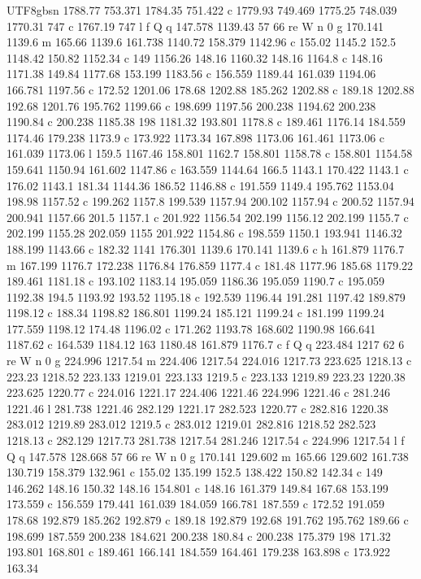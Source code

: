 \documentclass[11pt,a4paper,oneside]{report}
\begin{document}
\begin{CJK*}{UTF8}{gbsn}
{1788.77 753.371 1784.35 751.422 c 1779.93 749.469 1775.25 748.039 1770.31 747 c 1767.19 747 l f Q q
147.578 1139.43 57 66 re W n 0 g 170.141 1139.6 m 165.66 1139.6 161.738 1140.72 158.379 1142.96 c 155.02
1145.2 152.5 1148.42 150.82 1152.34 c 149 1156.26 148.16 1160.32 148.16 1164.8 c 148.16 1171.38 149.84
1177.68 153.199 1183.56 c 156.559 1189.44 161.039 1194.06 166.781 1197.56 c 172.52 1201.06 178.68 1202.88
185.262 1202.88 c 189.18 1202.88 192.68 1201.76 195.762 1199.66 c 198.699 1197.56 200.238 1194.62 200.238
1190.84 c 200.238 1185.38 198 1181.32 193.801 1178.8 c 189.461 1176.14 184.559 1174.46 179.238 1173.9 c
173.922 1173.34 167.898 1173.06 161.461 1173.06 c 161.039 1173.06 l 159.5 1167.46 158.801 1162.7 158.801
1158.78 c 158.801 1154.58 159.641 1150.94 161.602 1147.86 c 163.559 1144.64 166.5 1143.1 170.422 1143.1 c
176.02 1143.1 181.34 1144.36 186.52 1146.88 c 191.559 1149.4 195.762 1153.04 198.98 1157.52 c 199.262
1157.8 199.539 1157.94 200.102 1157.94 c 200.52 1157.94 200.941 1157.66 201.5 1157.1 c 201.922 1156.54
202.199 1156.12 202.199 1155.7 c 202.199 1155.28 202.059 1155 201.922 1154.86 c 198.559 1150.1 193.941
1146.32 188.199 1143.66 c 182.32 1141 176.301 1139.6 170.141 1139.6 c h 161.879 1176.7 m 167.199 1176.7
172.238 1176.84 176.859 1177.4 c 181.48 1177.96 185.68 1179.22 189.461 1181.18 c 193.102 1183.14 195.059
1186.36 195.059 1190.7 c 195.059 1192.38 194.5 1193.92 193.52 1195.18 c 192.539 1196.44 191.281 1197.42
189.879 1198.12 c 188.34 1198.82 186.801 1199.24 185.121 1199.24 c 181.199 1199.24 177.559 1198.12 174.48
1196.02 c 171.262 1193.78 168.602 1190.98 166.641 1187.62 c 164.539 1184.12 163 1180.48 161.879 1176.7 c
f Q q 223.484 1217 62 6 re W n 0 g 224.996 1217.54 m 224.406 1217.54 224.016 1217.73 223.625 1218.13 c
223.23 1218.52 223.133 1219.01 223.133 1219.5 c 223.133 1219.89 223.23 1220.38 223.625 1220.77 c 224.016
1221.17 224.406 1221.46 224.996 1221.46 c 281.246 1221.46 l 281.738 1221.46 282.129 1221.17 282.523
1220.77 c 282.816 1220.38 283.012 1219.89 283.012 1219.5 c 283.012 1219.01 282.816 1218.52 282.523
1218.13 c 282.129 1217.73 281.738 1217.54 281.246 1217.54 c 224.996 1217.54 l f Q q 147.578 128.668 57 66
re W n 0 g 170.141 129.602 m 165.66 129.602 161.738 130.719 158.379 132.961 c 155.02 135.199 152.5
138.422 150.82 142.34 c 149 146.262 148.16 150.32 148.16 154.801 c 148.16 161.379 149.84 167.68 153.199
173.559 c 156.559 179.441 161.039 184.059 166.781 187.559 c 172.52 191.059 178.68 192.879 185.262 192.879
c 189.18 192.879 192.68 191.762 195.762 189.66 c 198.699 187.559 200.238 184.621 200.238 180.84 c 200.238
175.379 198 171.32 193.801 168.801 c 189.461 166.141 184.559 164.461 179.238 163.898 c 173.922 163.34
}
\end{CJK*}
\end{document}
